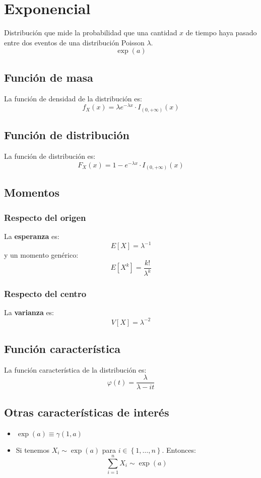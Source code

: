\section{Exponencial}
\label{sec:exponencial}
Distribución que mide la probabilidad que una cantidad $x$ de tiempo haya pasado entre 
dos eventos de una distribución Poisson $\lambda$.
\[
\boxed{\exp\left( a \right)}
\]

\subsection{Función de masa}
La función de densidad de la distribución es:
\[
f_X \left( x \right) = \lambda e^{-\lambda x} \cdot I_{\left( 0, +\infty \right)}\left( x \right)
\]

\subsection{Función de distribución}
La función de distribución es:
\[
F_X\left( x \right) = 1 - e^{-\lambda x} \cdot I_{\left( 0, +\infty \right)}\left( x \right)
\]

\subsection{Momentos}

\subsubsection*{Respecto del origen}
La \textbf{esperanza} es: 
\[
    E\left[ X \right] = \lambda^{-1}
\]
y un momento genérico: 
\[
    E\left[ X^k \right] = \frac{k!}{\lambda^k}
\]
\subsubsection*{Respecto del centro}
La \textbf{varianza} es:
\[
    V\left[ X \right] = \lambda^{-2}
\]

\subsection{Función característica}
La función característica de la distribución es:
\[
\varphi\left( t \right) = \frac{\lambda}{\lambda - it}
\]

\subsection{Otras características de interés}
\begin{itemize}
    \item $\exp\left( a \right) \equiv \gamma\left( 1, a \right)$
    \item Si tenemos $X_i \sim \exp\left( a \right)$ para $i \in \left\{ 1, \ldots, n \right\}$. Entonces:
    \[
    \sum_{i=1}^{n} X_i \sim \exp \left( a \right) 
    \]
\end{itemize}

